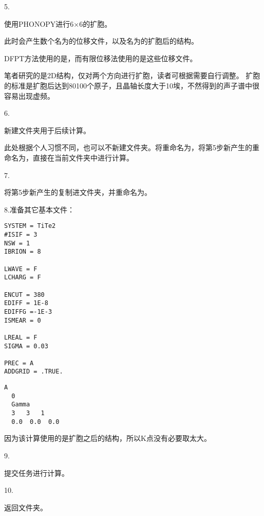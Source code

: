 5.

使用PHONOPY进行6×6的扩胞。

此时会产生数个名为的位移文件，以及名为的扩胞后的结构。

DFPT方法使用的是，而有限位移法使用的是这些位移文件。

\begin{attention}
   笔者研究的是2D结构，仅对两个方向进行扩胞，读者可根据需要自行调整。
   扩胞的标准是扩胞后达到80\ttilde100个原子，且晶轴长度大于10埃，不然得到的声子谱中很容易出现虚频。
\end{attention}

6.

新建文件夹用于后续计算。

\begin{extend}
  此处根据个人习惯不同，也可以不新建文件夹。将重命名为，将第5步新产生的重命名为，直接在当前文件夹中进行计算。
\end{extend}

7.

将第5步新产生的复制进文件夹，并重命名为。

8.准备其它基本文件：

\begin{lstlisting}[caption=INCAR]
SYSTEM = TiTe2
#ISIF = 3
NSW = 1
IBRION = 8

LWAVE = F
LCHARG = F

ENCUT = 380
EDIFF = 1E-8
EDIFFG =-1E-3
ISMEAR = 0

LREAL = F
SIGMA = 0.03

PREC = A
ADDGRID = .TRUE.
\end{lstlisting}

\begin{lstlisting}[caption=KPOINTS]
  A
  0
  Gamma
  3   3   1
  0.0  0.0  0.0
\end{lstlisting}

\begin{attention}
 因为该计算使用的是扩胞之后的结构，所以K点没有必要取太大。
\end{attention}



9.

提交任务进行计算。

10.

返回文件夹。

